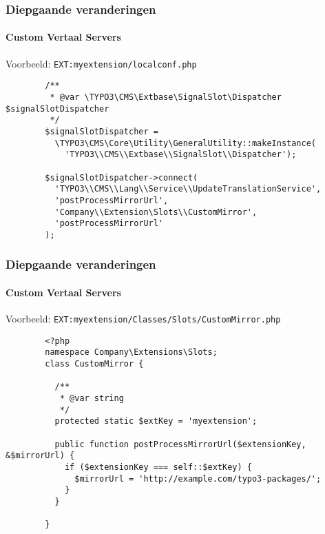 
\begin{frame}[fragile]
	\frametitle{Diepgaande veranderingen}
	\framesubtitle{Custom Vertaal Servers}

	Voorbeeld: \texttt{EXT:myextension/localconf.php}

	\lstset{
		basicstyle=\tiny\ttfamily
	}

	\begin{lstlisting}
		/**
		 * @var \TYPO3\CMS\Extbase\SignalSlot\Dispatcher $signalSlotDispatcher
		 */
		$signalSlotDispatcher =
		  \TYPO3\CMS\Core\Utility\GeneralUtility::makeInstance(
		    'TYPO3\\CMS\\Extbase\\SignalSlot\\Dispatcher');

		$signalSlotDispatcher->connect(
		  'TYPO3\\CMS\\Lang\\Service\\UpdateTranslationService',
		  'postProcessMirrorUrl',
		  'Company\\Extension\Slots\\CustomMirror',
		  'postProcessMirrorUrl'
		);
	\end{lstlisting}

\end{frame}


\begin{frame}[fragile]
	\frametitle{Diepgaande veranderingen}
	\framesubtitle{Custom Vertaal Servers}

	Voorbeeld: \texttt{EXT:myextension/Classes/Slots/CustomMirror.php}

	\lstset{
		basicstyle=\tiny\ttfamily
	}

	\begin{lstlisting}
		<?php
		namespace Company\Extensions\Slots;
		class CustomMirror {

		  /**
		   * @var string
		   */
		  protected static $extKey = 'myextension';

		  public function postProcessMirrorUrl($extensionKey, &$mirrorUrl) {
		    if ($extensionKey === self::$extKey) {
		      $mirrorUrl = 'http://example.com/typo3-packages/';
		    }
		  }

		}
	\end{lstlisting}

\end{frame}

